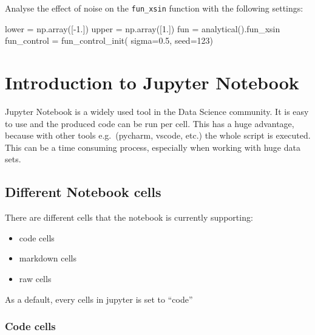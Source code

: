 \documentclass[
  letterpaper,
  DIV=11,
  numbers=noendperiod]{scrreprt}
\newenvironment{Shaded}{\begin{snugshade}}{\end{snugshade}}
\newcommand{\DecValTok}[1]{\textcolor[rgb]{0.68,0.00,0.00}{#1}}
\newcommand{\FloatTok}[1]{\textcolor[rgb]{0.68,0.00,0.00}{#1}}
\newcommand{\NormalTok}[1]{\textcolor[rgb]{0.00,0.23,0.31}{#1}}
\newcommand{\OperatorTok}[1]{\textcolor[rgb]{0.37,0.37,0.37}{#1}}
\begin{document}
Analyse the effect of noise on the \texttt{fun\_xsin} function with the
following settings:

\begin{Shaded}
\begin{Highlighting}[]
\NormalTok{lower }\OperatorTok{=}\NormalTok{ np.array([}\OperatorTok{{-}}\FloatTok{1.}\NormalTok{])}
\NormalTok{upper }\OperatorTok{=}\NormalTok{ np.array([}\FloatTok{1.}\NormalTok{])}
\NormalTok{fun }\OperatorTok{=}\NormalTok{ analytical().fun\_xsin}
\NormalTok{fun\_control }\OperatorTok{=}\NormalTok{ fun\_control\_init(    }
\NormalTok{    sigma}\OperatorTok{=}\FloatTok{0.5}\NormalTok{,}
\NormalTok{    seed}\OperatorTok{=}\DecValTok{123}\NormalTok{)}
\end{Highlighting}
\end{Shaded}

\cleardoublepage
{}
{}
\appendix

\hypertarget{introduction-to-jupyter-notebook}{%
\chapter{Introduction to Jupyter
Notebook}\label{introduction-to-jupyter-notebook}}

Jupyter Notebook is a widely used tool in the Data Science community. It
is easy to use and the produced code can be run per cell. This has a
huge advantage, because with other tools e.g.~(pycharm, vscode, etc.)
the whole script is executed. This can be a time consuming process,
especially when working with huge data sets.

\hypertarget{different-notebook-cells}{%
\section{Different Notebook cells}\label{different-notebook-cells}}

There are different cells that the notebook is currently supporting:

\begin{itemize}
\item
  code cells
\item
  markdown cells
\item
  raw cells
\end{itemize}

As a default, every cells in jupyter is set to ``code''

\hypertarget{code-cells}{%
\subsection{Code cells}\label{code-cells}}
\end{document}
